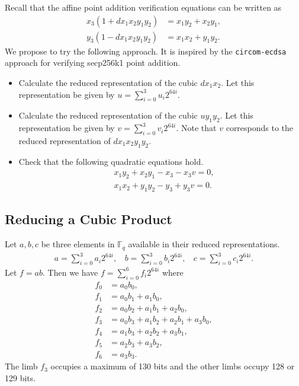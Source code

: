 \documentclass[a4paper, 12pt]{article}
\begin{document}
Recall that the affine point addition verification equations can be written as
\begin{align}
  x_3(1+dx_1x_2y_1y_2) &= x_1y_2 + x_2y_1,\\
  y_3(1-dx_1x_2y_1y_2) &= x_1x_2 + y_1y_2.
  \label{eqn:additionAffineVerification}
\end{align}
We propose to try the following approach. It is inspired by the \texttt{circom-ecdsa} approach for verifying secp256k1 point addition.
\begin{itemize}
  \item Calculate the reduced representation of the cubic $dx_1x_2$. Let this representation be given by $u = \sum_{i=0}^{3}u_i 2^{64i}$.
  \item Calculate the reduced representation of the cubic $uy_1y_2$. Let this representation be given by $v = \sum_{i=0}^{3}v_i 2^{64i}$. Note that $v$ corresponds to the reduced representation of $dx_1x_2y_1y_2$.
  \item Check that the following quadratic equations hold.
    \begin{align*}
      & x_1y_2 + x_2y_1 -x_3 - x_3 v = 0,\\
      & x_1x_2 + y_1y_2 -y_3 + y_3 v = 0.
    \end{align*}
\end{itemize}

\subsection{Reducing a Cubic Product}%
\label{subsec:reducing_a_cubic_product}
Let $a,b,c$ be three elements in $\mathbb{F}_q$ available in their reduced representations.
\begin{align*}
  a = \sum^{3}_{i=0} a_i 2^{64i}, \ \ \ \ b = \sum^{3}_{i=0} b_i 2^{64i}, \ \ \ \ c = \sum^{3}_{i=0} c_i 2^{64i}.
\end{align*}
Let $f = ab$. Then we have $f = \sum_{i=0}^{6} f_i 2^{64i}$ where
\begin{align*}
  f_0 & = a_0b_0,\\
  f_1 & = a_0b_1 + a_1b_0,\\
  f_2 & = a_0b_2 + a_1b_1 + a_2b_0,\\
  f_3 & = a_0b_3 + a_1b_2 + a_2b_1 + a_3b_0,\\
  f_4 & = a_1b_3 + a_2b_2 + a_3b_1,\\
  f_5 & = a_2b_3 + a_3b_2,\\
  f_6 & = a_3b_3.
\end{align*}
The limb $f_3$ occupies a maximum of 130 bits and the other limbs occupy 128 or 129 bits.
\end{document}
